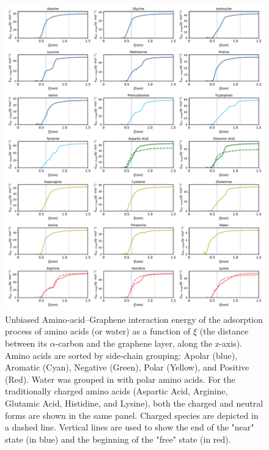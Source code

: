 \documentclass[9pt]{article}
\begin{document}
\begin{figure}[hbtp]
    \centering
    \includegraphics[width=\textwidth]{FigS4.pdf}
    \caption{Unbiased Amino-acid--Graphene interaction energy of the adsorption process of amino acids (or water) as a function of $\xi$ (the distance between its $\alpha$-carbon and the graphene layer, along the z-axis). Amino acids are sorted by side-chain grouping: Apolar (blue), Aromatic (Cyan), Negative (Green), Polar (Yellow), and Positive (Red). Water was grouped in with polar amino acids. For the traditionally charged amino acids (Aspartic Acid, Arginine, Glutamic Acid,  Histidine, and Lysine), both the charged and neutral forms are shown in the same panel. Charged species are depicted in a dashed line. Vertical lines are used to show the end of the "near" state (in blue) and the beginning of the "free" state (in red).}
    \label{fig:EnergyAA-G}
\end{figure}
\end{document}

